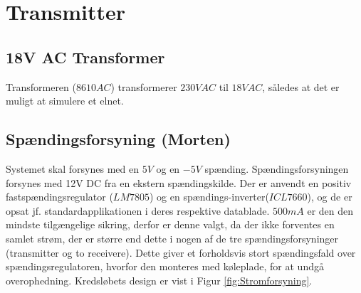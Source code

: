 \section{Transmitter}

\subsection{18V AC Transformer}
Transformeren ($8610AC$)\cite{lib:Adaptor} transformerer $230V AC$ til $18V AC$, således at det er muligt at simulere et elnet.

\subsection{Spændingsforsyning (Morten)}
Systemet skal forsynes med en $5V$ og en $-5V$ spænding. Spændingsforsyningen forsynes med 12V DC fra en ekstern spændingskilde. Der er anvendt en positiv fastspændingsregulator ($LM7805$)\cite{lib:LM7805} og en spændings-inverter($ICL7660$)\cite{lib:IC7660}, og de er opsat jf. standardapplikationen i deres respektive datablade.
$500 mA$ er den den mindste tilgængelige sikring, derfor er denne valgt, da der ikke forventes en samlet strøm, der er større end dette i nogen af de tre spændingsforsyninger (transmitter og to receivere). Dette giver et forholdsvis stort spændingsfald over spændingsregulatoren, hvorfor den monteres med køleplade, for at undgå overophedning. 
Kredsløbets design er vist i Figur \ref{fig:Stromforsyning}.
